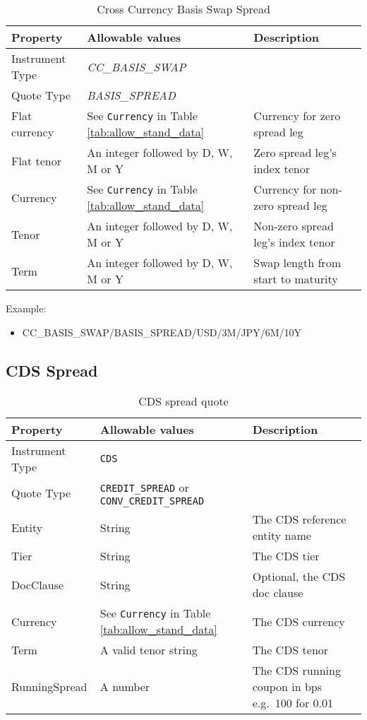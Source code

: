 \begin{table}[H]
\centering
  \begin{tabular}{|p{3cm}|p{3.5cm}|p{7cm}|}
    \hline
    {\bf Property} & {\bf Allowable values} & {\bf Description} \\ \hline
    Instrument Type & \emph{CC\_BASIS\_SWAP} & \\ \hline
    Quote Type & \emph{BASIS\_SPREAD} & \\ \hline
    Flat currency & See \lstinline!Currency! in Table \ref{tab:allow_stand_data} & Currency for zero spread leg\\  \hline
    Flat tenor & An integer followed by D, W, M or Y & Zero spread leg's index tenor\\ \hline
    Currency & See \lstinline!Currency! in Table \ref{tab:allow_stand_data}& Currency for non-zero spread leg\\ \hline
    Tenor & An integer followed by D, W, M or Y & Non-zero spread leg's index tenor\\ \hline
    Term & An integer followed by D, W, M or Y & Swap length from start to maturity\\ \hline
  \end{tabular}
  \caption{Cross Currency Basis Swap Spread}
  \label{tab:ccbasisspread_quote}
\end{table}


\medskip
Example:
\begin{itemize}
\item {CC\_BASIS\_SWAP/BASIS\_SPREAD/USD/3M/JPY/6M/10Y}
\end{itemize}

\subsection{CDS Spread}
\label{md:cds_spread_quote}

\begin{table}[H]
\centering
  \begin{tabular}{|p{3cm}|p{3.5cm}|p{7cm}|}
    \hline
    {\bf Property} & {\bf Allowable values} & {\bf Description} \\ \hline
    Instrument Type & \lstinline!CDS! & \\ \hline
    Quote Type & \lstinline!CREDIT_SPREAD! or \lstinline!CONV_CREDIT_SPREAD! & \\ \hline
    Entity & String & The CDS reference entity name \\ \hline
    Tier & String & The CDS tier \\ \hline
    DocClause & String & Optional, the CDS doc clause \\ \hline
    Currency & See \lstinline!Currency! in Table \ref{tab:allow_stand_data} & The CDS currency\\ \hline
    Term & A valid tenor string & The CDS tenor\\ \hline
    RunningSpread & A number & The CDS running coupon in bps e.g.\ 100 for 0.01\\ \hline
  \end{tabular}
  \caption{CDS spread quote}
  \label{tab:cdsspread_quote}
\end{table}

